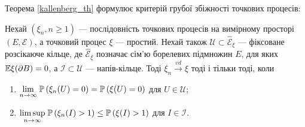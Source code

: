 
Теорема \ref{kallenberg_th} формулює критерій грубої збіжності
точкових процесів:
\begin{theorem*}
    Нехай $\left(\xi_n, n \geq 1\right)$ --- послідовність 
    точкових процесів на вимірному просторі $\left(E, \mathcal{E}\right)$,
    а точковий процес $\xi$ --- простий. Нехай також
    $\mathcal{U} \subset \hat{\mathcal{E}}_\xi$ --- фіксоване
    розсікаюче кільце, де $\hat{\mathcal{E}}_\xi$ позначає сім'ю
    борелевих підмножин $E$, для яких $\E \xi (\partial B) = 0$,
    а $\mathcal{I}\subset\mathcal{U}$ --- напів-кільце. 
    Тоді 
    $\xi_n \overset{vd}{\longrightarrow} \xi$ тоді і тільки тоді, коли
    \begin{enumerate}
        \item $\underset{n\to\infty}{\lim}\;\P{\xi_n(U) = 0} = \P{\xi(U) = 0}$ для $U\in\mathcal{U}$;
        \item $\underset{n\to\infty}{\limsup}\; \P{\xi_n(I) > 1} \leq \P{\xi(I) > 1}$ для $I \in \mathcal{I}$.
    \end{enumerate}
\end{theorem*}

